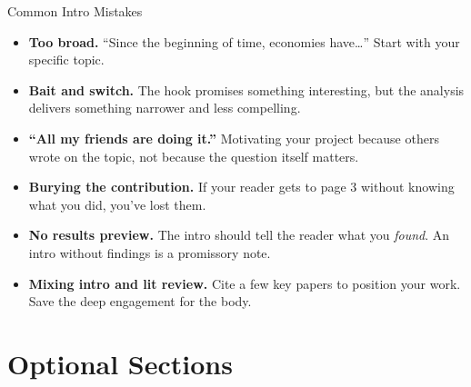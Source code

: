 \begin{frame}{Common Intro Mistakes}
  \begin{itemize}
    \item \textbf{Too broad.} ``Since the beginning of time, economies have\ldots'' Start with your specific topic.

    \vspace{3pt}

    \item \textbf{Bait and switch.} The hook promises something interesting, but the analysis delivers something narrower and less compelling.

    \vspace{3pt}

    \item \textbf{``All my friends are doing it.''} Motivating your project because others wrote on the topic, not because the question itself matters.

    \vspace{3pt}

    \item \textbf{Burying the contribution.} If your reader gets to page 3 without knowing what you did, you've lost them.

    \vspace{3pt}

    \item \textbf{No results preview.} The intro should tell the reader what you \emph{found}. An intro without findings is a promissory note.

    \vspace{3pt}

    \item \textbf{Mixing intro and lit review.} Cite a few key papers to position your work. Save the deep engagement for the body.
  \end{itemize}
\end{frame}

\section{Optional Sections}

